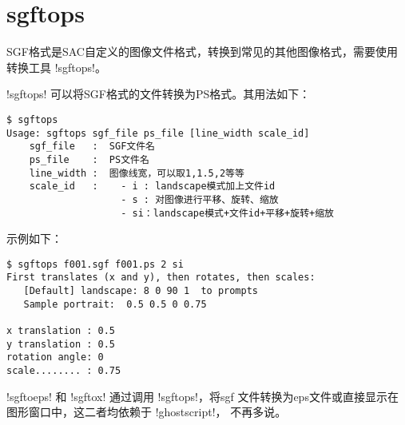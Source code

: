 \section{sgftops}
\label{sec:sgftops}
\label{sec:sgftoeps}
\label{sec:sgftox}

SGF格式是SAC自定义的图像文件格式，转换到常见的其他图像格式，需要使用
转换工具 !sgftops!。

!sgftops! 可以将SGF格式的文件转换为PS格式。其用法如下：
\begin{verbatim}
$ sgftops
Usage: sgftops sgf_file ps_file [line_width scale_id]
    sgf_file   :  SGF文件名
    ps_file    :  PS文件名
    line_width :  图像线宽，可以取1,1.5,2等等
    scale_id   :    - i : landscape模式加上文件id
                    - s : 对图像进行平移、旋转、缩放
                    - si：landscape模式+文件id+平移+旋转+缩放
\end{verbatim}

示例如下：
\begin{verbatim}
$ sgftops f001.sgf f001.ps 2 si
First translates (x and y), then rotates, then scales:
   [Default] landscape: 8 0 90 1  to prompts
   Sample portrait:  0.5 0.5 0 0.75

x translation : 0.5
y translation : 0.5
rotation angle: 0
scale........ : 0.75
\end{verbatim}

!sgftoeps! 和 !sgftox! 通过调用 !sgftops!，将sgf
文件转换为eps文件或直接显示在图形窗口中，这二者均依赖于 !ghostscript!，
不再多说。

